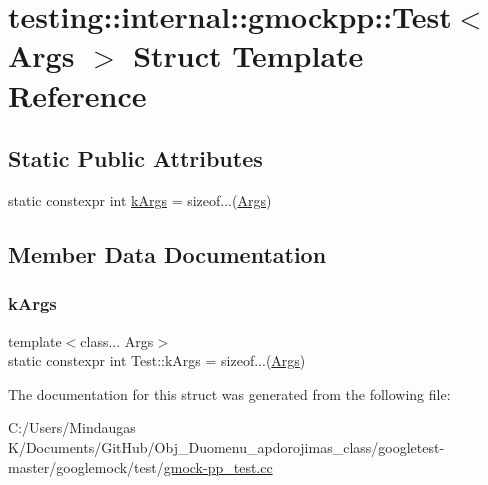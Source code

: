 \hypertarget{structtesting_1_1internal_1_1gmockpp_1_1_test}{}\section{testing\+::internal\+::gmockpp\+::Test$<$ Args $>$ Struct Template Reference}
\label{structtesting_1_1internal_1_1gmockpp_1_1_test}
\subsection*{Static Public Attributes}
\begin{DoxyCompactItemize}
\item 
static constexpr int \mbox{\hyperlink{structtesting_1_1internal_1_1gmockpp_1_1_test_ac99cf1732bc32026092af6ef89a5b728}{k\+Args}} = sizeof...(\mbox{\hyperlink{namespacetesting_aaca153f67b689b8b9d5b8c67ecf8cee4}{Args}})
\end{DoxyCompactItemize}


\subsection{Member Data Documentation}
\mbox{\label{structtesting_1_1internal_1_1gmockpp_1_1_test_ac99cf1732bc32026092af6ef89a5b728}} 
\subsubsection{\texorpdfstring{kArgs}{kArgs}}
{\footnotesize\ttfamily template$<$class... Args$>$ \\
static constexpr int Test\+::k\+Args = sizeof...(\mbox{\hyperlink{namespacetesting_aaca153f67b689b8b9d5b8c67ecf8cee4}{Args}})\hspace{0.3cm}{\ttfamily [static]}}



The documentation for this struct was generated from the following file\+:\begin{DoxyCompactItemize}
\item 
C\+:/\+Users/\+Mindaugas K/\+Documents/\+Git\+Hub/\+Obj\+\_\+\+Duomenu\+\_\+apdorojimas\+\_\+class/googletest-\/master/googlemock/test/\mbox{\hyperlink{googletest-master_2googlemock_2test_2gmock-pp__test_8cc}{gmock-\/pp\+\_\+test.\+cc}}\end{DoxyCompactItemize}
